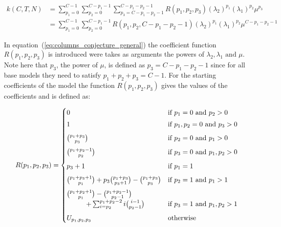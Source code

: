 \begin{align}\label{eq:columns_conjecture_general}
    k(C,T,N) &= \sum_{p_1=0}^{C-1} \sum_{p_2=0}^{C-p_1-1} 
    \sum_{p_3=C - p_1 - p_2 - 1}^{C - p_1 - p_2 - 1} R(p_1, p_2, p_3) 
    (\lambda_2)^{p_1} (\lambda_1)^{p_2} \mu^{p_3} \nonumber \\ 
    &= \sum_{p_1=0}^{C-1} \sum_{p_2=0}^{C-p_1-1} R(p_1, p_2, C-p_1-p_2-1) 
    (\lambda_2)^{p_1} (\lambda_1)^{p_2} \mu^{C-p_1-p_2-1} 
\end{align}

In equation~(\ref{eq:columns_conjecture_general}) the coefficient function 
\(R(p_1,p_2,p_3)\) is introduced were takes as arguments the powers of 
\(\lambda_2, \lambda_1 \text{ and } \mu\). 
Note here that \(p_3\), the power of \(\mu\), is defined as \(p_3=C-p_1-p_2-1\) 
since for all base models they need to satisfy \(p_1 + p_2 + p_3 = C-1\). 
For the starting coefficients of the model the function \(R(p_1,p_2,p_3)\) gives 
the values of the coefficients and is defined as:

\begin{equation} \label{eq:coefficient_function}
    R(p_1,p_2,p_3) = 
    \begin{cases}
        0 & \text{if } p_1 = 0 \text{ and } p_2 > 0 \vspace{0.1cm} \\
        1 & \text{if } p_1, p_2 = 0 \text{ and } p_3 > 0 \vspace{0.2cm} \\
        \binom{p_1 + p_3}{p_3} & \text{if } p_2 = 0 
        \text{ and } p_1 > 0 \vspace{0.2cm} \\
        \binom{p_1 + p_2 - 1}{p_2} & \text{if } p_3 = 0 
        \text{ and } p_1, p_2 > 0 \vspace{0.2cm} \\
        p_3 + 1 & \text{if } p_1 = 1 \vspace{0.2cm} \\
        \binom{p_1 + p_3 + 1}{p_1} + p_3 \binom{p_1 + p_3}{p_3+1} - 
        \binom{p_1 + p_3}{p_3} & \text{if } p_2 = 1 
        \text{ and } p_1 > 1 \vspace{0.2cm} \\
        \binom{p_1 + p_2 + 1}{p_1} - \binom{p_1 + p_2 - 1}{p_2-1} & \\
        \hspace{1cm} + \sum_{i=p_2}^{p_1 + p_2 - 2} i \binom{i-1}{p_2 - 1} &
        \text{if } p_3 = 1 
        \text{ and } p_1,p_2 > 1 \vspace{0.2cm} \\
        U_{p_1,p_2,p_3} & \text{otherwise}
    \end{cases}
\end{equation}


